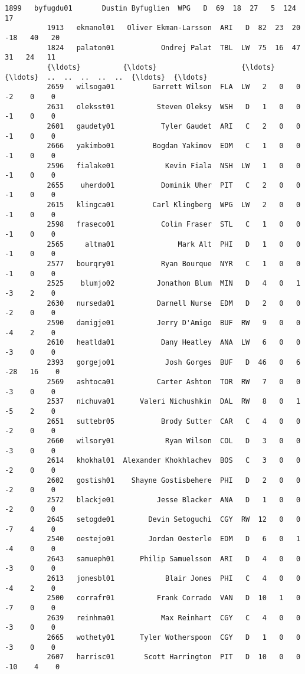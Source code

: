 \documentclass[11pt]{article}
\begin{document}
\begin{Verbatim}[commandchars=\\\{\}]
          1899   byfugdu01       Dustin Byfuglien  WPG   D  69  18  27   5  124   17   
          1913   ekmanol01   Oliver Ekman-Larsson  ARI   D  82  23  20 -18   40   20   
          1824   palaton01           Ondrej Palat  TBL  LW  75  16  47  31   24   11   
          {\ldots}          {\ldots}                    {\ldots}  {\ldots}  ..  ..  ..  ..  ..  {\ldots}  {\ldots}   
          2659   wilsoga01         Garrett Wilson  FLA  LW   2   0   0  -2    0    0   
          2631   oleksst01          Steven Oleksy  WSH   D   1   0   0  -1    0    0   
          2601   gaudety01           Tyler Gaudet  ARI   C   2   0   0  -1    0    0   
          2666   yakimbo01         Bogdan Yakimov  EDM   C   1   0   0  -1    0    0   
          2596   fialake01            Kevin Fiala  NSH  LW   1   0   0  -1    0    0   
          2655    uherdo01           Dominik Uher  PIT   C   2   0   0  -1    0    0   
          2615   klingca01         Carl Klingberg  WPG  LW   2   0   0  -1    0    0   
          2598   fraseco01           Colin Fraser  STL   C   1   0   0  -1    0    0   
          2565     altma01               Mark Alt  PHI   D   1   0   0  -1    0    0   
          2577   bourqry01           Ryan Bourque  NYR   C   1   0   0  -1    0    0   
          2525    blumjo02          Jonathon Blum  MIN   D   4   0   1  -3    2    0   
          2630   nurseda01          Darnell Nurse  EDM   D   2   0   0  -2    0    0   
          2590   damigje01          Jerry D'Amigo  BUF  RW   9   0   0  -4    2    0   
          2610   heatlda01           Dany Heatley  ANA  LW   6   0   0  -3    0    0   
          2393   gorgejo01            Josh Gorges  BUF   D  46   0   6 -28   16    0   
          2569   ashtoca01          Carter Ashton  TOR  RW   7   0   0  -3    0    0   
          2537   nichuva01      Valeri Nichushkin  DAL  RW   8   0   1  -5    2    0   
          2651   suttebr05           Brody Sutter  CAR   C   4   0   0  -2    0    0   
          2660   wilsory01            Ryan Wilson  COL   D   3   0   0  -3    0    0   
          2614   khokhal01  Alexander Khokhlachev  BOS   C   3   0   0  -2    0    0   
          2602   gostish01    Shayne Gostisbehere  PHI   D   2   0   0  -2    0    0   
          2572   blackje01          Jesse Blacker  ANA   D   1   0   0  -2    0    0   
          2645   setogde01        Devin Setoguchi  CGY  RW  12   0   0  -7    4    0   
          2540   oestejo01        Jordan Oesterle  EDM   D   6   0   1  -4    0    0   
          2643   samueph01      Philip Samuelsson  ARI   D   4   0   0  -3    0    0   
          2613   jonesbl01            Blair Jones  PHI   C   4   0   0  -4    2    0   
          2500   corrafr01          Frank Corrado  VAN   D  10   1   0  -7    0    0   
          2639   reinhma01           Max Reinhart  CGY   C   4   0   0  -3    0    0   
          2665   wothety01      Tyler Wotherspoon  CGY   D   1   0   0  -3    0    0   
          2607   harrisc01       Scott Harrington  PIT   D  10   0   0 -10    4    0   
          

\end{Verbatim}
\end{document}

